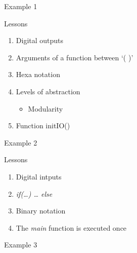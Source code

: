 \begin{frame}{Example 1}



\end{frame}

\begin{frame}{Lessons}

\begin{enumerate}
\def\labelenumi{\arabic{enumi}.}
\tightlist
\item
  Digital outputs
\item
  Arguments of a function between `( )'
\item
  Hexa notation
\item
  Levels of abstraction

  \begin{itemize}
  \tightlist
  \item
    Modularity
  \end{itemize}
\item
  Function initIO()
\end{enumerate}

\end{frame}

\begin{frame}{Example 2}



\end{frame}

\begin{frame}{Lessons}

\begin{enumerate}
\def\labelenumi{\arabic{enumi}.}
\tightlist
\item
  Digital intputs
\item
  \emph{if(\ldots{}) \ldots{} else}
\item
  Binary notation
\item
  The \emph{main} function is executed once
\end{enumerate}

\end{frame}

\begin{frame}{Example 3}



\end{frame}

